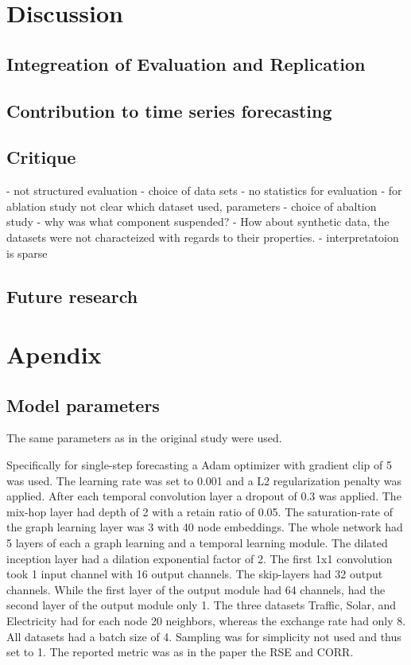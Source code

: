 \documentclass[letterpaper,twocolumn,11pt]{article}
\begin{document}
    \section{Discussion}

    \subsection{Integreation of Evaluation and Replication}

    \subsection{Contribution to time series forecasting}

    \subsection{Critique}
    - not structured evaluation
    - choice of data sets
    - no statistics for evaluation
    - for ablation study not clear which dataset used, parameters
    - choice of abaltion study - why was what component suspended?
    - How about synthetic data, the datasets were not characteized with regards to their properties.
    - interpretatoion is sparse
    \subsection{Future research}

    {\footnotesize 
    }


    \theendnotes


    \section{Apendix}

    \subsection{Model parameters}\label{model_parameters}
    The same parameters as in the original study were used.

    Specifically for single-step forecasting a Adam optimizer with gradient clip of 5 was used.
    The learning rate was set to 0.001 and a L2 regularization penalty was applied.
    After each temporal convolution layer a dropout of 0.3 was applied.
    The mix-hop layer had depth of 2 with a retain ratio of 0.05.
    The saturation-rate of the graph learning layer was 3 with 40 node embeddings.
    The whole network had 5 layers of each a graph learning and a temporal learning module.
    The dilated inception layer had a dilation exponential factor of 2.
    The first 1x1 convolution took 1 input channel with 16 output channels.
    The skip-layers had 32 output channels.
    While the first layer of the output module had 64 channels, had the second layer of the output module only 1.
    The three datasets Traffic, Solar, and Electricity had for each node 20 neighbors, whereas the exchange rate had only 8.
    All datasets had a batch size of 4.
    Sampling was for simplicity not used and thus set to 1.
    The reported metric was as in the paper the RSE and CORR.
\end{document}
